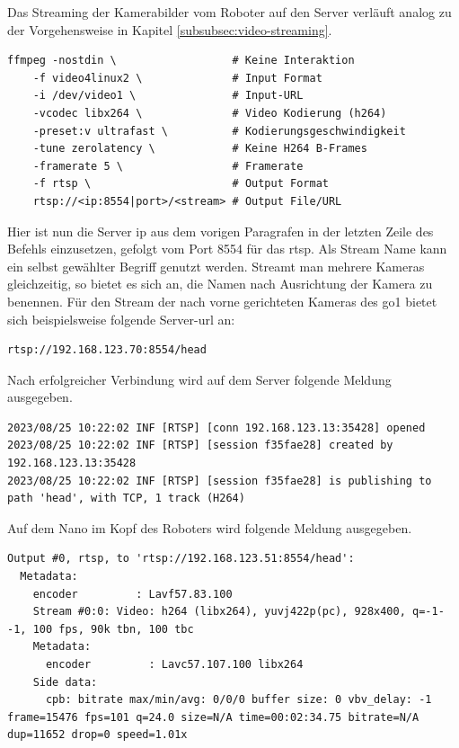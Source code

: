 
Das Streaming der Kamerabilder vom Roboter auf den Server verläuft analog zu der Vorgehensweise in Kapitel \ref{subsubsec:video-streaming}.

\begin{lstlisting}
ffmpeg -nostdin \                  # Keine Interaktion
    -f video4linux2 \              # Input Format
    -i /dev/video1 \               # Input-URL
    -vcodec libx264 \              # Video Kodierung (h264)
    -preset:v ultrafast \          # Kodierungsgeschwindigkeit
    -tune zerolatency \            # Keine H264 B-Frames
    -framerate 5 \                 # Framerate
    -f rtsp \                      # Output Format
    rtsp://<ip:8554|port>/<stream> # Output File/URL
\end{lstlisting}

Hier ist nun die Server \gls{ip} aus dem vorigen Paragrafen in der letzten Zeile des Befehls einzusetzen, gefolgt vom Port
\num{8554} für das \gls{rtsp}.
Als Stream Name kann ein selbst gewählter Begriff genutzt werden.
Streamt man mehrere Kameras gleichzeitig, so bietet es sich an, die Namen nach Ausrichtung der Kamera zu benennen.
Für den Stream der nach vorne gerichteten Kameras des \gls{go1} bietet sich beispielsweise folgende Server-\gls{url} an:

\begin{lstlisting}
rtsp://192.168.123.70:8554/head
\end{lstlisting}

\noindent Nach erfolgreicher Verbindung wird auf dem Server folgende Meldung ausgegeben.

\begin{lstlisting}
2023/08/25 10:22:02 INF [RTSP] [conn 192.168.123.13:35428] opened
2023/08/25 10:22:02 INF [RTSP] [session f35fae28] created by 192.168.123.13:35428
2023/08/25 10:22:02 INF [RTSP] [session f35fae28] is publishing to path 'head', with TCP, 1 track (H264)
\end{lstlisting}

\noindent Auf dem Nano im Kopf des Roboters wird folgende Meldung ausgegeben.

\begin{lstlisting}
Output #0, rtsp, to 'rtsp://192.168.123.51:8554/head':
  Metadata:
    encoder         : Lavf57.83.100
    Stream #0:0: Video: h264 (libx264), yuvj422p(pc), 928x400, q=-1--1, 100 fps, 90k tbn, 100 tbc
    Metadata:
      encoder         : Lavc57.107.100 libx264
    Side data:
      cpb: bitrate max/min/avg: 0/0/0 buffer size: 0 vbv_delay: -1
frame=15476 fps=101 q=24.0 size=N/A time=00:02:34.75 bitrate=N/A dup=11652 drop=0 speed=1.01x
\end{lstlisting}

